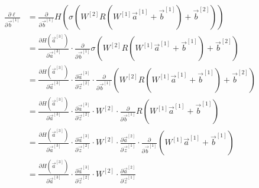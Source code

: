 \documentclass[12pt,titlepage]{article}
\begin{document}
\begin{align*}
  \frac{\partial \ell}{\partial \vec{b}^{[1]}}
   & = \frac{\partial}{\partial \vec{b}^{[1]}} H(\sigma(W^{[2]} R(W^{[1]} \vec{a}^{[1]} + \vec{b}^{[1]}) + \vec{b}^{[2]}))                                                                                                                                                                  \\
   & = \frac{\partial H(\vec{a}^{[3]})}{\partial \vec{a}^{[3]}} \cdot \frac{\partial}{\partial \vec{b}^{[1]}} \sigma(W^{[2]} R(W^{[1]} \vec{a}^{[1]} + \vec{b}^{[1]}) + \vec{b}^{[2]})                                                                                                      \\
   & = \frac{\partial H(\vec{a}^{[3]})}{\partial \vec{a}^{[3]}} \cdot \frac{\partial \vec{a}^{[3]}}{\partial \vec{z}^{[2]}} \cdot \frac{\partial}{\partial \vec{b}^{[1]}} (W^{[2]} R(W^{[1]} \vec{a}^{[1]} + \vec{b}^{[1]}) + \vec{b}^{[2]})                                                \\
   & = \frac{\partial H(\vec{a}^{[3]})}{\partial \vec{a}^{[3]}} \cdot \frac{\partial \vec{a}^{[3]}}{\partial \vec{z}^{[2]}} \cdot W^{[2]} \cdot \frac{\partial}{\partial \vec{b}^{[1]}} R(W^{[1]} \vec{a}^{[1]} + \vec{b}^{[1]})                                                            \\
   & = \frac{\partial H(\vec{a}^{[3]})}{\partial \vec{a}^{[3]}} \cdot \frac{\partial \vec{a}^{[3]}}{\partial \vec{z}^{[2]}} \cdot W^{[2]} \cdot \frac{\partial \vec{a}^{[2]}}{\partial \vec{z}^{[1]}} \cdot \frac{\partial}{\partial \vec{b}^{[1]}} (W^{[1]} \vec{a}^{[1]} + \vec{b}^{[1]}) \\
   & = \frac{\partial H(\vec{a}^{[3]})}{\partial \vec{a}^{[3]}} \cdot \frac{\partial \vec{a}^{[3]}}{\partial \vec{z}^{[2]}} \cdot W^{[2]} \cdot \frac{\partial \vec{a}^{[2]}}{\partial \vec{z}^{[1]}}
\end{align*}
\end{document}
